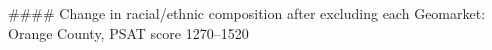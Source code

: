 #### Change in racial/ethnic composition after excluding each Geomarket: Orange County, PSAT score 1270–1520
